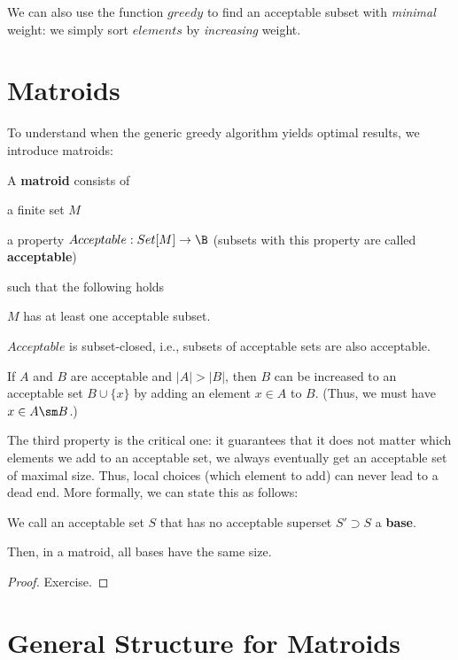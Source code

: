 We can also use the function $greedy$ to find an acceptable subset with \emph{minimal} weight: we simply sort $elements$ by \emph{increasing} weight.

\section{Matroids}

To understand when the generic greedy algorithm yields optimal results, we introduce matroids:

\begin{definition}[Matroid]
A \textbf{matroid} consists of
\begin{compactitem}
\item a finite set $M$
\item a property $Acceptable:Set[M]\to\B$ (subsets with this property are called \textbf{acceptable}\footnotemark)
\end{compactitem}
such that the following holds
\begin{compactitem}
 \item $M$ has at least one acceptable subset.
 \item $Acceptable$ is subset-closed, i.e., subsets of acceptable sets are also acceptable.
 \item If $A$ and $B$ are acceptable and $|A|>|B|$, then $B$ can be increased to an acceptable set $B\cup\{x\}$ by adding an element $x\in A$ to $B$. (Thus, we must have $x\in A\sm B$.)
\end{compactitem}
\end{definition}

The third property is the critical one: it guarantees that it does not matter which elements we add to an acceptable set, we always eventually get an acceptable set of maximal size.
Thus, local choices (which element to add) can never lead to a dead end.
More formally, we can state this as follows:
\begin{theorem}
We call an acceptable set $S$ that has no acceptable superset $S'\supset S$ a \textbf{base}.

Then, in a matroid, all bases have the same size.
\end{theorem}
\begin{proof}
Exercise.
\end{proof}

\section{General Structure for Matroids}

